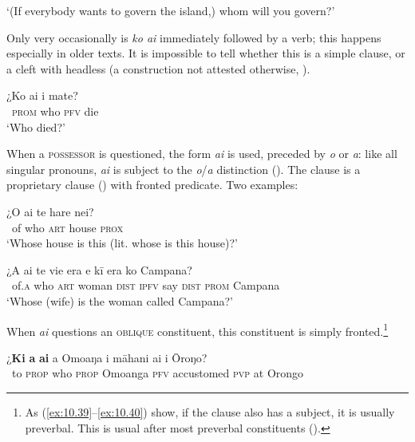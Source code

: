 \glt
‘(If everybody wants to govern the island,) whom will you govern?’ \textstyleExampleref{[R647.370]} 
\z

Only very occasionally is \textit{ko ai} immediately followed by a verb; this happens especially in older texts. It is impossible to tell whether this is a simple clause, or a cleft with headless  (a construction not attested otherwise, ).

\ea\label{ex:10.36}
\gll ¿Ko ai i mate? \\
~\textsc{prom} who \textsc{pfv} die \\

\glt 
‘Who died?’ \textstyleExampleref{[MsE-046.009]}
\z

When a \textsc{possessor} is questioned, the form \textit{{\ꞌ}ai} is used, preceded by \textit{o} or \textit{{\ꞌ}a}: like all singular pronouns, \textit{{\ꞌ}ai} is subject to the \textit{o}/\textit{a} distinction (). The clause is a proprietary clause () with fronted predicate. Two examples:

\ea\label{ex:10.37}
\gll ¿O {\ꞌ}ai te hare nei? \\
~of who \textsc{art} house \textsc{prox} \\

\glt 
‘Whose house is this (lit. whose is this house)?’ \textstyleExampleref{[R208.194]} 
\z

\ea\label{ex:10.38}
\gll ¿{\ꞌ}A {\ꞌ}ai te vi{\ꞌ}e era e kī era ko Campana? \\
~of\textsc{.a} who \textsc{art} woman \textsc{dist} \textsc{ipfv} say \textsc{dist} \textsc{prom} Campana \\

\glt 
‘Whose (wife) is the woman called Campana?’ \textstyleExampleref{[R416.1164]}
\z

When \textit{ai} questions an \textsc{oblique} constituent, this constituent is simply fronted.\footnote{\label{fn:488}As (\ref{ex:10.39}–\ref{ex:10.40}) show, if the clause also has a subject, it is usually preverbal. This is usual after most preverbal constituents ().} 

\ea\label{ex:10.39}
\gll ¿\textbf{Ki} \textbf{a} \textbf{ai} a Omoaŋa i māhani ai {\ꞌ}i {\ꞌ}Ōroŋo? \\
~to \textsc{prop} who \textsc{prop} Omoanga \textsc{pfv} accustomed \textsc{pvp} at Orongo \\

